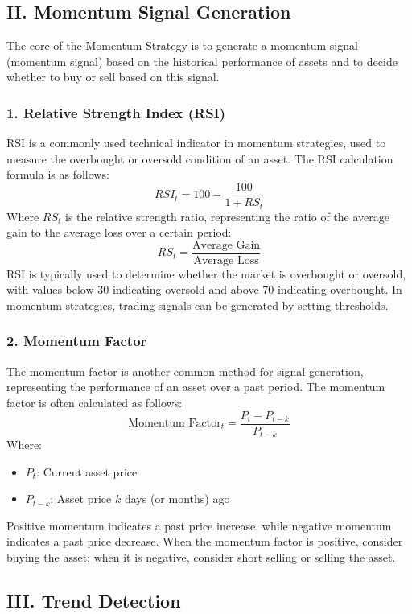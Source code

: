 \documentclass[12pt, oneside]{article}
\numberwithin{equation}{section}
\begin{document}
\subsection*{II. Momentum Signal Generation}

The core of the Momentum Strategy is to generate a momentum signal (momentum signal) based on the historical performance of assets and to decide whether to buy or sell based on this signal.

\subsubsection*{1. Relative Strength Index (RSI)}

RSI is a commonly used technical indicator in momentum strategies, used to measure the overbought or oversold condition of an asset. The RSI calculation formula is as follows:
\[
RSI_t = 100 - \frac{100}{1 + RS_t}
\]
Where \( RS_t \) is the relative strength ratio, representing the ratio of the average gain to the average loss over a certain period:
\[
RS_t = \frac{\text{Average Gain}}{\text{Average Loss}}
\]
RSI is typically used to determine whether the market is overbought or oversold, with values below 30 indicating oversold and above 70 indicating overbought. In momentum strategies, trading signals can be generated by setting thresholds.

\subsubsection*{2. Momentum Factor}

The momentum factor is another common method for signal generation, representing the performance of an asset over a past period. The momentum factor is often calculated as follows:
\[
\text{Momentum Factor}_t = \frac{P_t - P_{t-k}}{P_{t-k}}
\]
Where:
\begin{itemize}
    \item \( P_t \): Current asset price
    \item \( P_{t-k} \): Asset price \( k \) days (or months) ago
\end{itemize}
Positive momentum indicates a past price increase, while negative momentum indicates a past price decrease.
When the momentum factor is positive, consider buying the asset; when it is negative, consider short selling or selling the asset.

\subsection*{III. Trend Detection}
\end{document}
